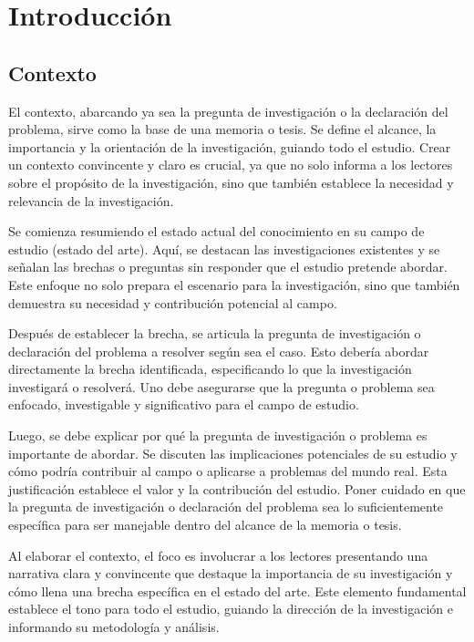 \section{Introducción}

\subsection{Contexto}
El contexto, abarcando ya sea la pregunta de investigación o la declaración del problema, sirve como la base de una memoria o tesis. Se define el alcance, la importancia y la orientación de la investigación, guiando todo el estudio. Crear un contexto convincente y claro es crucial, ya que no solo informa a los lectores sobre el propósito de la investigación, sino que también establece la necesidad y relevancia de la investigación.

Se comienza resumiendo el estado actual del conocimiento en su campo de estudio (estado del arte). Aquí, se destacan las investigaciones existentes y se señalan las brechas o preguntas sin responder que el estudio pretende abordar. Este enfoque no solo prepara el escenario para la investigación, sino que también demuestra su necesidad y contribución potencial al campo.

Después de establecer la brecha, se articula la pregunta de investigación o declaración del problema a resolver según sea el caso. Esto debería abordar directamente la brecha identificada, especificando lo que la investigación investigará o resolverá. Uno debe asegurarse que la pregunta o problema sea enfocado, investigable y significativo para el campo de estudio.

Luego, se debe explicar por qué la pregunta de investigación o problema es importante de abordar. Se discuten las implicaciones potenciales de su estudio y cómo podría contribuir al campo o aplicarse a problemas del mundo real. Esta justificación establece el valor y la contribución del estudio. Poner cuidado en que la pregunta de investigación o declaración del problema sea lo suficientemente específica para ser manejable dentro del alcance de la memoria o tesis. 

Al elaborar el contexto, el foco es involucrar a los lectores presentando una narrativa clara y convincente que destaque la importancia de su investigación y cómo llena una brecha específica en el estado del arte. Este elemento fundamental establece el tono para todo el estudio, guiando la dirección de la investigación e informando su metodología y análisis.

